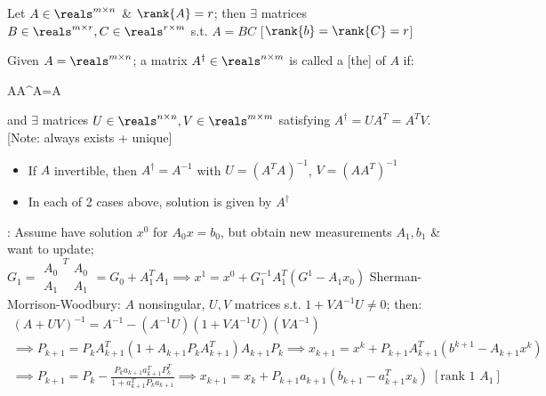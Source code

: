 \documentclass[12pt]{extarticle}
\begin{document}
\begin{lemma}
    Let $A\in\reals^{m\times n}$ \& $\rank{A}=r$; then $\exists$ matrices $B\in\reals^{m\times r},C\in\reals^{r\times m}$ s.t. $A=BC$ [$\rank{b}=\rank{C}=r$]
\end{lemma}
\begin{definition}
    Given $A=\reals^{m\times n}$; a matrix $A^\dagger\in\reals^{n\times m}$ is called a [the]  of $A$ if: \begin{eqnbox}
        AA^\dagger A=A
    \end{eqnbox}
    and $\exists$ matrices $U\in\reals^{n\times n},V\in\reals^{m\times m}$ satisfying $A^\dagger=UA^T=A^TV$. [Note: always exists + unique]
\end{definition}
\begin{itemize}
    \item If $A$ invertible, then $A^\dagger=A^{-1}$ with $U=(A^TA)^{-1}$, $V=(AA^T)^{-1}$
    \item In each of 2 cases above, solution is given by $A^\dagger$
\end{itemize}
: Assume have solution $x^0$ for $A_0x=b_0$, but obtain new measurements $A_1,b_1$ \& want to update; $G_1=\begin{smallmatrix}
    A_0 \\ A_1
\end{smallmatrix}^T\begin{smallmatrix}
    A_0 \\ A_1
\end{smallmatrix}=G_0+A_1^TA_1\implies x^1=x^0+G_1^{-1}A_1^T(G^1-A_1x_0)$
Sherman-Morrison-Woodbury: $A$ nonsingular, $U,V$ matrices s.t. $1+VA^{-1}U\neq0$; then: \begin{gather*}
    (A+UV)^{-1}=A^{-1}-(A^{-1}U)(1+VA^{-1}U)(VA^{-1}) \\
    \implies P_{k+1}=P_kA^T_{k+1}(1+A_{k+1}P_kA_{k+1}^T)A_{k+1}P_k\implies x_{k+1}=x^k+P_{k+1}A_{k+1}^T(b^{k+1}-A_{k+1}x^k) \\
    \implies P_{k+1}=P_k-\frac{P_ka_{k+1}a_{k+1}^TP_k^T}{1+a^T_{k+1}P_ka_{k+1}}\implies x_{k+1}=x_k+P_{k+1}a_{k+1}(b_{k+1}-a_{k+1}^Tx_k)\;[\text{rank 1 $A_1$}]
\end{gather*}


\pagebreak
\end{document}

